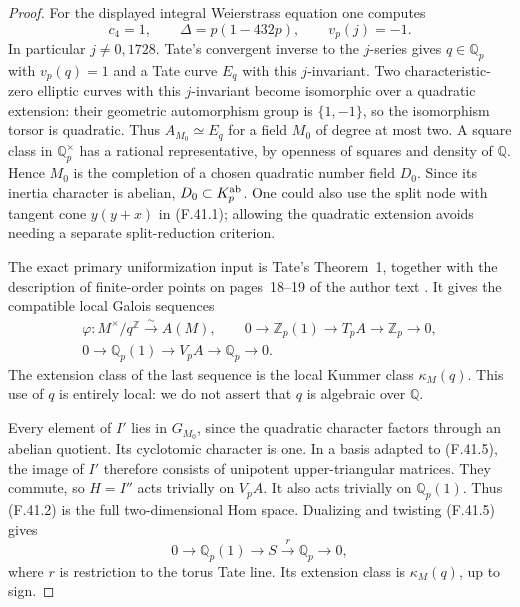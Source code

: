 \documentclass[11pt]{article}
\begin{document}
\begin{proof}
For the displayed integral Weierstrass
equation one computes
\[
             c_4=1,\qquad
             \Delta=p(1-432p),\qquad
             v_p(j)=-1.
                                                        \tag{F.41.4}
\]
In particular \(j\ne0,1728\).
Tate's convergent inverse to the
\(j\)-series gives \(q\in\mathbb Q_p\)
with \(v_p(q)=1\) and a Tate curve
\(E_q\) with this \(j\)-invariant.
Two characteristic-zero elliptic curves
with this \(j\)-invariant become
isomorphic over a quadratic extension:
their geometric automorphism group
is \(\{1,-1\}\), so the isomorphism
torsor is quadratic. Thus
\(A_{M_0}\simeq E_q\) for a field
\(M_0\) of degree at most two.
A square class in \(\mathbb Q_p^\times\)
has a rational representative, by
openness of squares and density of
\(\mathbb Q\). Hence \(M_0\) is
the completion of a chosen quadratic
number field \(D_0\). Since its
inertia character is abelian,
\(D_0\subset K_p^{\rm ab}\).
One could also use the split node
with tangent cone \(y(y+x)\) in
(F.41.1); allowing the quadratic
extension avoids needing a separate
split-reduction criterion.

The exact primary uniformization
input is Tate's Theorem~1, together
with the description of finite-order
points on pages~18--19 of the author
text \citep{FF_Tate1995}. It gives
the compatible local Galois sequences
\[
 \begin{gathered}
   \varphi:M^\times/q^{\mathbb Z}
                         \xrightarrow{\sim}A(M),\qquad
   0\longrightarrow\mathbb Z_p(1)
    \longrightarrow T_pA
    \longrightarrow\mathbb Z_p\longrightarrow0,\\
   0\longrightarrow\mathbb Q_p(1)
    \longrightarrow V_pA
    \longrightarrow\mathbb Q_p\longrightarrow0.
 \end{gathered}
                                                        \tag{F.41.5}
\]
The extension class of the last
sequence is the local Kummer class
\(\kappa_M(q)\). This use of \(q\)
is entirely local: we do not assert
that \(q\) is algebraic over
\(\mathbb Q\).

Every element of \(I'\) lies in
\(G_{M_0}\), since the quadratic
character factors through an abelian
quotient. Its cyclotomic character
is one. In a basis adapted to
(F.41.5), the image of \(I'\)
therefore consists of unipotent
upper-triangular matrices. They
commute, so \(H=I''\) acts trivially
on \(V_pA\). It also acts trivially
on \(\mathbb Q_p(1)\). Thus (F.41.2)
is the full two-dimensional Hom space.
Dualizing and twisting (F.41.5) gives
\[
 0\longrightarrow\mathbb Q_p(1)
  \longrightarrow S
  \xrightarrow{\ r\ }\mathbb Q_p
  \longrightarrow0,
                                                        \tag{F.41.6}
\]
where \(r\) is restriction to the
torus Tate line. Its extension class
is \(\kappa_M(q)\), up to sign.


\end{proof}
\end{document}
